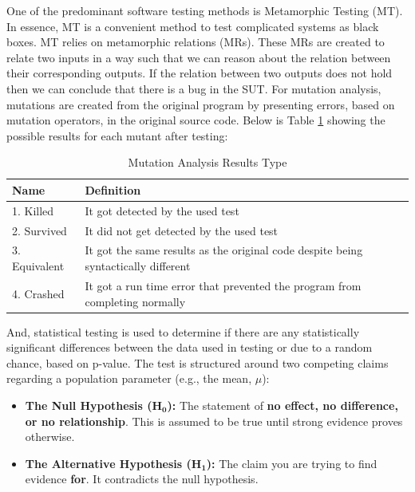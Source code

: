 \documentclass[12pt,a4paper]{article}
\begin{document}
	One of the predominant software testing methods is Metamorphic Testing (MT). In essence, MT is a convenient method to test complicated systems as black boxes. MT relies on metamorphic relations (MRs). These MRs are created to relate two inputs in a way such that we can reason about the relation between their corresponding outputs. If the relation between two outputs does not hold then we can conclude that there is a bug in the SUT. For mutation analysis, mutations are created from the original program by presenting errors, based on mutation operators, in the original source code. Below is Table \ref{tab:mutation_analysis} showing the possible results for each mutant after testing:
	
	\begin{table}[h!]
		\centering
		\caption{Mutation Analysis Results Type}
		\label{tab:mutation_analysis}
		\begin{tabular}{|l|l|}
			\hline
			\textbf{Name} & \textbf{Definition} \\
			\hline
			1. Killed &  It got detected by the used test \\
			2.  Survived & It did not get detected by the used test\\
			3. Equivalent & It got the same results as the original code despite being syntactically different \\
			4. Crashed & It got a run time error that prevented the program from completing normally \\
			
			\hline
		\end{tabular}
	\end{table}
	
	And, statistical testing is used to determine if there are any statistically significant differences between the data used in testing or due to a random chance, based on p-value. The test is structured around two competing claims regarding a population parameter (e.g., the mean, $\mu$):
	
	\begin{itemize}
		\item[$\bullet$] \textbf{The Null Hypothesis ($\mathbf{H_0}$):} The statement of \textbf{no effect, no difference, or no relationship}. This is assumed to be true until strong evidence proves otherwise.
		\item[$\bullet$] \textbf{The Alternative Hypothesis ($\mathbf{H_1}$):} The claim you are trying to find evidence \textbf{for}. It contradicts the null hypothesis.
	\end{itemize}
	
\end{document}
